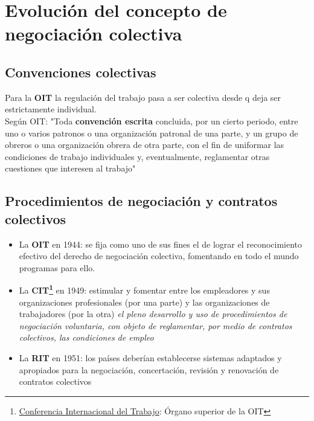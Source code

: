 \documentclass[spanish,12pt,a4paper,titlepage]{report}
\begin{document}
\section{Evolución del concepto de negociación colectiva}
\subsection{Convenciones colectivas}
Para la \textbf{OIT} la regulación del trabajo pasa a ser colectiva desde q deja ser estrictamente individual.\\

Según OIT: "Toda \textbf{convención escrita} concluida, por un cierto periodo, entre uno o varios patronos o una organización patronal de una parte, y un grupo de obreros o una organización obrera de otra parte, con el fin de uniformar las condiciones de trabajo individuales y, eventualmente, reglamentar otras cuestiones que interesen al trabajo"

\subsection{Procedimientos de negociación y contratos colectivos}
\begin{itemize}
	\item La \textbf{OIT} en 1944: se fija como uno de sus fines el de lograr el reconocimiento efectivo del derecho de negociación colectiva, fomentando en todo el mundo programas para ello.

	\item La \textbf{CIT\footnote{\href{http://es.wikipedia.org/wiki/Organizacion_Internacional_del_Trabajo\#Conferencia_Internacional}{Conferencia Internacional del Trabajo}: Órgano superior de la OIT}} en 1949: estimular y fomentar entre los empleadores y sus organizaciones profesionales (por una parte) y las organizaciones de trabajadores (por la otra) \textit{el pleno desarrollo y uso de procedimientos de negociación voluntaria, con objeto de reglamentar, por medio de contratos colectivos, las condiciones de empleo}

	\item La \textbf{RIT} en 1951: los países deberían establecerse sistemas adaptados y apropiados para la negociación, concertación, revisión y renovación de contratos colectivos
\end{itemize}
\end{document}
